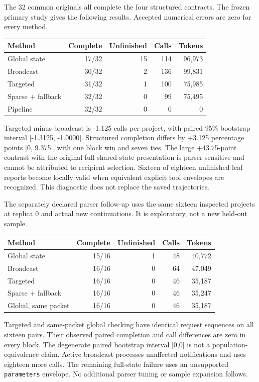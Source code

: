The 32 common originals all complete the four structured contracts. The frozen primary study gives the following results. Accepted numerical errors are zero for every method.
\begin{center}
\begin{tabular}{lrrrr}
\toprule
Method & Complete & Unfinished & Calls & Tokens \\
\midrule
Global state & 17/32 & 15 & 114 & 96,973 \\
Broadcast & 30/32 & 2 & 136 & 99,831 \\
Targeted & 31/32 & 1 & 100 & 75,985 \\
Sparse + fallback & 32/32 & 0 & 99 & 75,495 \\
Pipeline & 32/32 & 0 & 0 & 0 \\
\bottomrule
\end{tabular}
\end{center}
Targeted minus broadcast is -1.125 calls per project, with paired 95\% bootstrap interval [-1.3125, -1.0000]. Structured completion differs by +3.125 percentage points [0, 9.375], with one block win and seven ties. The large +43.75-point contrast with the original full shared-state presentation is parser-sensitive and cannot be attributed to recipient selection. Sixteen of eighteen unfinished leaf reports become locally valid when equivalent explicit tool envelopes are recognized. This diagnostic does not replace the saved trajectories.

The separately declared parser follow-up uses the same sixteen inspected projects at replica 0 and actual new continuations. It is exploratory, not a new held-out sample.
\begin{center}
\begin{tabular}{lrrrr}
\toprule
Method & Complete & Unfinished & Calls & Tokens \\
\midrule
Global state & 15/16 & 1 & 48 & 40,772 \\
Broadcast & 16/16 & 0 & 64 & 47,049 \\
Targeted & 16/16 & 0 & 46 & 35,187 \\
Sparse + fallback & 16/16 & 0 & 46 & 35,247 \\
Global, same packet & 16/16 & 0 & 46 & 35,187 \\
\bottomrule
\end{tabular}
\end{center}
Targeted and same-packet global checking have identical request sequences on all sixteen pairs. Their observed paired completion and call differences are zero in every block. The degenerate paired bootstrap interval [0,0] is not a population-equivalence claim. Active broadcast processes unaffected notifications and uses eighteen more calls. The remaining full-state failure uses an unsupported \texttt{parameters} envelope. No additional parser tuning or sample expansion follows.
